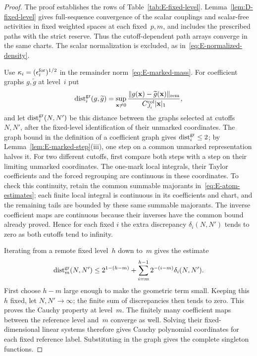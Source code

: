 \begin{proof}
The proof establishes the rows of Table~\ref{tab:E-fixed-level}. Lemma~\ref{lem:D-fixed-level} gives full-sequence convergence of the scalar couplings and scalar-free activities in fixed weighted spaces at each fixed~$p,m$, and includes the prescribed paths with the strict reserve. Thus the cutoff-dependent path arrays converge in the same charts. The scalar normalization is excluded, as in~\eqref{eq:E-normalized-density}.

Use $\kappa_i=(\epsilon_i^{\rm for})^{1/2}$ in the remainder norm~\eqref{eq:E-marked-mass}. For coefficient graphs $g,\widetilde g$ at level~$i$ put
\begin{equation*}
 \operatorname{dist}^{\rm gr}_i(g,\widetilde g)=\sup_{\mathbf x\ne0}\frac{\|g(\mathbf x)-\widetilde g(\mathbf x)\|_{\rm rem}}{C^{\rm col}_{J_i}|\mathbf x|_1},
\end{equation*}
and let $\operatorname{dist}^{\rm gr}_i(N,N')$ be this distance between the graphs selected at cutoffs $N,N'$, after the fixed-level identification of their unmarked coordinates. The graph bound in the definition of a coefficient graph gives $\operatorname{dist}^{\rm gr}_i\le2$; by Lemma~\ref{lem:E-marked-step}(iii), one step on a common unmarked representation halves it. For two different cutoffs, first compare both steps with a step on their limiting unmarked coordinates. The one-mark local integrals, their Taylor coefficients and the forced regrouping are continuous in these coordinates. To check this continuity, retain the common summable majorants in~\eqref{eq:E-atom-estimates}; each finite local integral is continuous in its coefficients and chart, and the remaining tails are bounded by these same summable majorants. The inverse coefficient maps are continuous because their inverses have the common bound already proved. Hence for each fixed $i$ the extra discrepancy $\delta_i(N,N')$ tends to zero as both cutoffs tend to infinity.

Iterating from a remote fixed level~$h$ down to~$m$ gives the estimate
\begin{equation}\label{eq:E-cross-cutoff}
 \operatorname{dist}^{\rm gr}_m(N,N')\le 2^{1-(h-m)}+
 \sum_{i=m}^{h-1}2^{-(i-m)}\delta_i(N,N').
\end{equation}
First choose $h-m$ large enough to make the geometric term small. Keeping this $h$ fixed, let $N,N'\to\infty$; the finite sum of discrepancies then tends to zero. This proves the Cauchy property at level~$m$. The finitely many coefficient maps between the reference level and~$m$ converge as well. Solving their fixed-dimensional linear systems therefore gives Cauchy polynomial coordinates for each fixed reference label. Substituting in the graph gives the complete singleton functions.


\end{proof}
